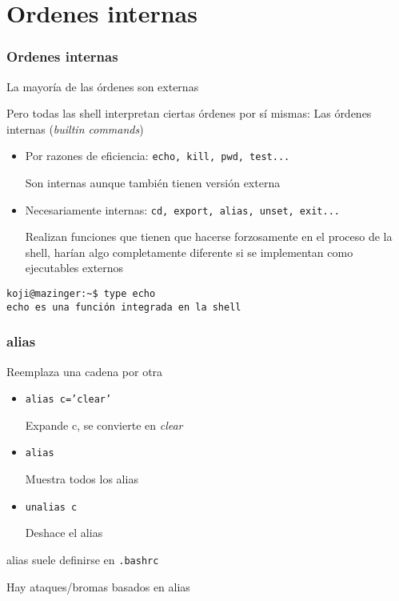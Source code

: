 \documentclass[ucs]{beamer}
\begin{document}


\section{Ordenes internas}
\begin{frame}[fragile]
  \frametitle{Ordenes internas}
La mayoría de las órdenes son externas



Pero todas las shell
interpretan ciertas órdenes por sí mismas: Las
órdenes internas (\emph{builtin commands}) 
\begin{itemize}
\item
Por
razones de eficiencia: \verb|echo, kill, pwd, test...|

Son internas aunque también tienen versión externa
\item
Necesariamente internas: \verb|cd, export, alias, unset, exit...|

Realizan funciones que tienen que hacerse
forzosamente en el proceso de la shell, harían algo completamente diferente si
se implementan como ejecutables externos 
\end{itemize}

\begin{verbatim}
koji@mazinger:~$ type echo
echo es una función integrada en la shell
\end{verbatim}

\end{frame}


\begin{frame}[fragile]
\frametitle{alias}
Reemplaza una cadena por otra
\begin{itemize}	
\item \texttt{alias c='clear'}

Expande c, se convierte en \emph{clear}
\item \texttt{alias }

Muestra todos los alias
\item \texttt{unalias c }

Deshace el alias
\end{itemize}
alias suele definirse en \verb|.bashrc|

Hay ataques/bromas basados en alias
\end{frame}
\end{document}
